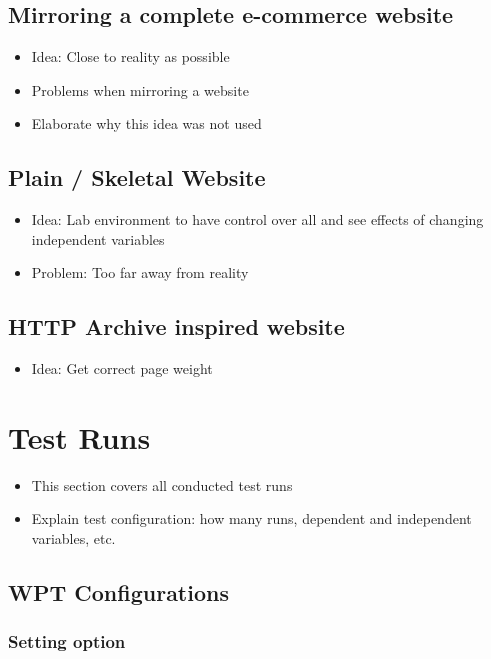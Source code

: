 \subsection{Mirroring a complete e-commerce website}

\begin{itemize}
    \item Idea: Close to reality as possible
    \item Problems when mirroring a website
    \item Elaborate why this idea was not used
\end{itemize}

\subsection{Plain / Skeletal Website}

\begin{itemize}
    \item Idea: Lab environment to have control over all and see effects of changing independent variables
    \item Problem: Too far away from reality
\end{itemize}

\subsection{HTTP Archive inspired website}

\begin{itemize}
    \item Idea: Get correct page weight
\end{itemize}

\section{Test Runs}

\begin{itemize}
    \item This section covers all conducted test runs
    \item Explain test configuration: how many runs, dependent and independent variables, etc.
\end{itemize}

\subsection{WPT Configurations}

\subsubsection{Setting option}

